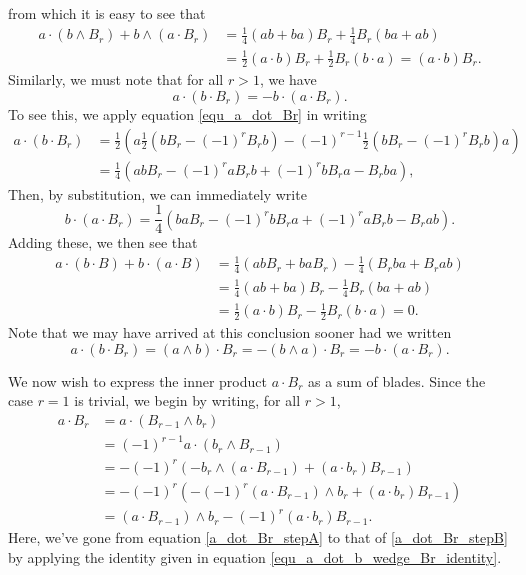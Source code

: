 \documentclass{birkjour}
\theoremstyle{definition}
\theoremstyle{remark}
\numberwithin{equation}{section}
\begin{document}
from which it is easy to see that
\begin{align*}
a\cdot(b\wedge B_r)+b\wedge(a\cdot B_r) &= \frac{1}{4}(ab+ba)B_r + \frac{1}{4}B_r(ba+ab) \\
 &= \frac{1}{2}(a\cdot b)B_r + \frac{1}{2}B_r(b\cdot a) = (a\cdot b)B_r.
\end{align*}
Similarly, we must note that for all $r>1$, we have
\begin{equation}\label{equ_a_dot_b_dot_Br_identity}
a\cdot(b\cdot B_r) = -b\cdot(a\cdot B_r).
\end{equation}
To see this, we apply equation \eqref{equ_a_dot_Br} in writing
\begin{align*}
a\cdot(b\cdot B_r)
 &= \frac{1}{2}\left(a\frac{1}{2}\left(bB_r-(-1)^rB_rb\right)-(-1)^{r-1}\frac{1}{2}\left(bB_r-(-1)^rB_rb\right)a\right) \\
 &= \frac{1}{4}\left(abB_r - (-1)^raB_rb + (-1)^rbB_ra - B_rba\right),
\end{align*}
Then, by substitution, we can immediately write
\begin{equation*}
b\cdot(a\cdot B_r) = \frac{1}{4}\left(baB_r - (-1)^rbB_ra + (-1)^raB_rb - B_rab\right).
\end{equation*}
Adding these, we then see that
\begin{align*}
a\cdot (b\cdot B)+b\cdot(a\cdot B)
 &= \frac{1}{4}\left(abB_r+baB_r\right)-\frac{1}{4}\left(B_rba+B_rab\right) \\
 &= \frac{1}{4}\left(ab+ba\right)B_r-\frac{1}{4}B_r\left(ba+ab\right) \\
 &= \frac{1}{2}(a\cdot b)B_r - \frac{1}{2}B_r(b\cdot a) = 0.
\end{align*}
Note that we may have arrived at this conclusion sooner had we written
\begin{equation*}
a\cdot(b\cdot B_r) = (a\wedge b)\cdot B_r = -(b\wedge a)\cdot B_r = -b\cdot(a\cdot B_r).
\end{equation*}

We now wish to express the inner product $a\cdot B_r$ as a sum of blades.
Since the case $r=1$ is trivial, we begin by writing, for all $r>1$,
\begin{align}
a\cdot B_r
 &= a\cdot(B_{r-1}\wedge b_r)\nonumber \\
 &= (-1)^{r-1}a\cdot(b_r\wedge B_{r-1})\label{a_dot_Br_stepA} \\
 &= -(-1)^r\left(-b_r\wedge(a\cdot B_{r-1})+(a\cdot b_r)B_{r-1}\right)\label{a_dot_Br_stepB} \\
 &= -(-1)^r\left(-(-1)^r(a\cdot B_{r-1})\wedge b_r+(a\cdot b_r)B_{r-1}\right)\nonumber \\
 &= (a\cdot B_{r-1})\wedge b_r - (-1)^r(a\cdot b_r)B_{r-1}.\label{equ_a_dot_Br_recursive}
\end{align}
Here, we've gone from equation \eqref{a_dot_Br_stepA} to that of \eqref{a_dot_Br_stepB} by
applying the identity given in equation \eqref{equ_a_dot_b_wedge_Br_identity}.
\end{document}
